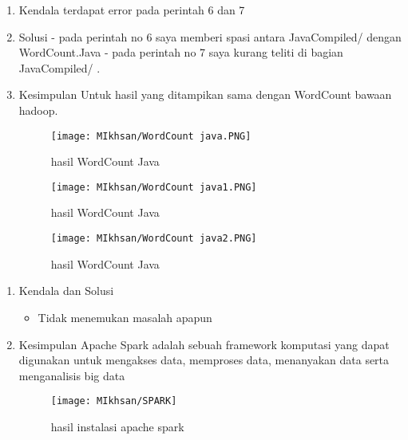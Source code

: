 \clearpage
{}
\begin{enumerate}
\item Kendala
terdapat error pada perintah 6 dan 7

\item Solusi
- pada perintah no 6 saya memberi spasi antara JavaCompiled/ dengan WordCount.Java
- pada perintah no 7 saya kurang teliti di bagian JavaCompiled/ .


\item Kesimpulan
Untuk hasil yang ditampikan sama dengan WordCount bawaan hadoop.

\begin{figure}[!ht]
    \texttt{[image: MIkhsan/WordCount java.PNG]}
    \caption{hasil WordCount Java }
    \label{gam:hasil}
    \end{figure}
\begin{figure}[!ht]
    \texttt{[image: MIkhsan/WordCount java1.PNG]}
    \caption{hasil WordCount Java }
    \label{gam:hasil}
    \end{figure}
\begin{figure}[!ht]
    \texttt{[image: MIkhsan/WordCount java2.PNG]}
    \caption{hasil WordCount Java}
    \label{gam:hasil}
    \end{figure}
\end{enumerate}

\begin{enumerate}
\item Kendala dan Solusi

\begin{itemize}
\item Tidak menemukan masalah apapun
\end{itemize}

\item Kesimpulan
\newline
Apache Spark adalah sebuah framework komputasi yang dapat digunakan untuk mengakses data, memproses data, menanyakan data serta menganalisis big data

\begin{figure}[!ht]
\texttt{[image: MIkhsan/SPARK]}
\caption{hasil instalasi apache spark }
\label{gam:hasil instalasi spark}
\end{figure}
\end{enumerate}

